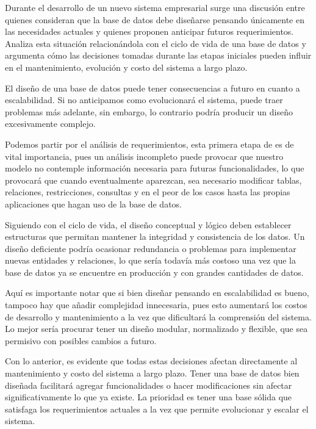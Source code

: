 \item Durante el desarrollo de un nuevo sistema empresarial surge una discusión entre quienes consideran que la base de datos debe diseñarse pensando únicamente en las necesidades actuales y quienes proponen anticipar futuros requerimientos. Analiza esta situación relacionándola con el ciclo de vida de una base de datos y argumenta cómo las decisiones tomadas durante las etapas iniciales pueden influir en el mantenimiento, evolución y costo del sistema a largo plazo.

El diseño de una base de datos puede tener consecuencias a futuro en cuanto a escalabilidad. Si no anticipamos como evolucionará el sistema, puede traer problemas más adelante, sin embargo, lo contrario podría producir un diseño excesivamente complejo.

Podemos partir por el análisis de requerimientos, esta primera etapa de es de vital importancia, pues un análisis incompleto puede provocar que nuestro modelo no contemple información necesaria para futuras funcionalidades, lo que provocará que cuando eventualmente aparezcan, sea necesario modificar tablas, relaciones, restricciones, consultas y en el peor de los casos hasta las propias aplicaciones que hagan uso de la base de datos.

Siguiendo con el ciclo de vida, el diseño conceptual y lógico deben establecer estructuras que permitan mantener la integridad y consistencia de los datos. Un diseño deficiente podría ocasionar redundancia o problemas para implementar nuevas entidades y relaciones, lo que sería todavía más costoso una vez que la base de datos ya se encuentre en producción y con grandes cantidades de datos.

Aquí es importante notar que si bien diseñar pensando en escalabilidad es bueno, tampoco hay que añadir complejidad innecesaria, pues esto aumentará los costos de desarrollo y mantenimiento a la vez que dificultará la comprensión del sistema. Lo mejor sería procurar tener un diseño modular, normalizado y flexible, que sea permisivo con posibles cambios a futuro.

Con lo anterior, es evidente que todas estas decisiones afectan directamente al mantenimiento y costo del sistema a largo plazo. Tener una base de datos bien diseñada facilitará agregar funcionalidades o hacer modificaciones sin afectar significativamente lo que ya existe. La prioridad es tener una base sólida que satisfaga los requerimientos actuales a la vez que permite evolucionar y escalar el sistema.
